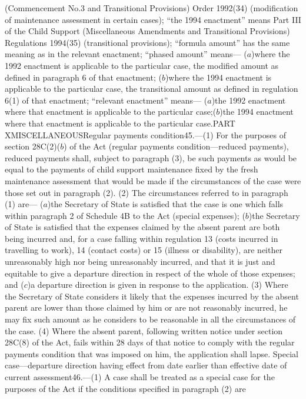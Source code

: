 \documentclass[a4paper]{article}
\begin{document}
(Commencement No.3 and Transitional Provisions) Order 1992(34) (modification of
maintenance assessment in certain cases);
“the 1994 enactment” means Part III of the Child Support (Miscellaneous
Amendments and Transitional Provisions) Regulations 1994(35) (transitional
provisions);
“formula amount” has the same meaning as in the relevant enactment;
“phased amount” means—
($a$)where the 1992 enactment is applicable to the particular case, the modified
amount as defined in paragraph 6 of that enactment;
($b$)where the 1994 enactment is applicable to the particular case, the
transitional amount as defined in regulation 6(1) of that enactment;
“relevant enactment” means—
($a$)the 1992 enactment where that enactment is applicable to the particular case;($b$)the 1994 enactment where that enactment is applicable to the particular case.PART XMISCELLANEOUSRegular payments condition45.—(1) For the purposes of section
28C(2)($b$) of the Act (regular payments condition—reduced payments), reduced
payments shall, subject to paragraph (3), be such payments as would be equal to
the payments of child support maintenance fixed by the fresh maintenance
assessment that would be made if the circumstances of the case were those set
out in paragraph (2).
(2) The circumstances referred to in paragraph (1) are—
($a$)the Secretary of State is satisfied that the case is one which falls within
paragraph 2 of Schedule 4B to the Act (special expenses);
($b$)the Secretary of State is satisfied that the expenses claimed by the absent
parent are both being incurred and, for a case falling within regulation 13
(costs incurred in travelling to work), 14 (contact costs) or 15 (illness or
disability), are neither unreasonably high nor being unreasonably incurred, and
that it is just and equitable to give a departure direction in respect of the
whole of those expenses; and
($c$)a departure direction is given in response to the application.
(3) Where the Secretary of State considers it likely that the expenses incurred
by the absent parent are lower than those claimed by him or are not reasonably
incurred, he may fix such amount as he considers to be reasonable in all the
circumstances of the case.
(4) Where the absent parent, following written notice under section 28C(8) of
the Act, fails within 28 days of that notice to comply with the regular payments
condition that was imposed on him, the application shall lapse.
Special case—departure direction having effect from date earlier than effective
date of current assessment46.—(1) A case shall be treated as a special case for
the purposes of the Act if the conditions specified in paragraph (2) are
\end{document}
